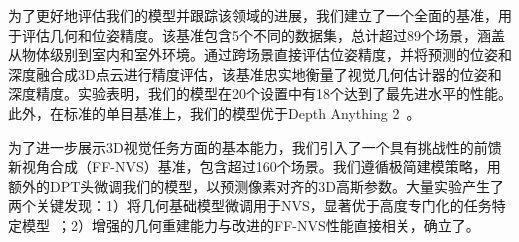 为了更好地评估我们的模型并跟踪该领域的进展，我们建立了一个全面的基准，用于评估几何和位姿精度。该基准包含5个不同的数据集，总计超过89个场景，涵盖从物体级别到室内和室外环境。通过跨场景直接评估位姿精度，并将预测的位姿和深度融合成3D点云进行精度评估，该基准忠实地衡量了视觉几何估计器的位姿和深度精度。实验表明，我们的模型在20个设置中有18个达到了最先进水平的性能。此外，在标准的单目基准上，我们的模型优于Depth Anything 2~\citep{yang2024depthv2}。

为了进一步展示3D视觉任务方面的基本能力，我们引入了一个具有挑战性的前馈新视角合成（FF-NVS）基准，包含超过160个场景。我们遵循极简建模策略，用额外的DPT头微调我们的模型，以预测像素对齐的3D高斯参数。大量实验产生了两个关键发现：1）将几何基础模型微调用于NVS，显著优于高度专门化的任务特定模型~\citep{xu2025depthsplat}；2）增强的几何重建能力与改进的FF-NVS性能直接相关，确立了。
